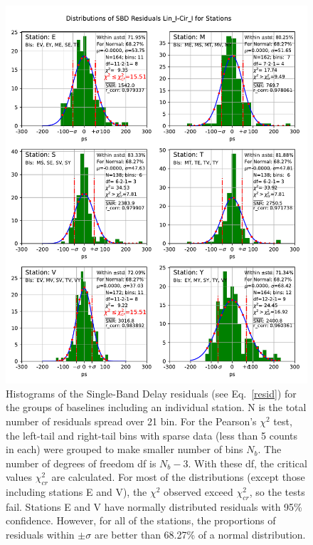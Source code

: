 \documentclass[letterpaper,twoside,12pt]{article}
\begin{document}
\begin{figure}[ht!]
  \begin{center}
  \includegraphics[width=33pc]{Distr_SBD_Lin_I-Cir_I_Diff_Stations.pdf}
  \caption{\small Histograms of the Single-Band Delay residuals (see Eq.~\eqref{resid}) for the groups of baselines including an individual station. N is the total number of residuals spread over 21 bin. For the Pearson's $\chi^2$ test, the left-tail and right-tail bins with sparse data (less than 5 counts in each) were grouped to make smaller number of bins $N_b$. The number of degrees of freedom df is $N_b-3$. With these df, the critical values $\chi^2_{cr}$ are calculated. For most of the distributions (except those including stations E and V), the $\chi^2$ observed exceed $\chi^2_{cr}$, so the tests fail. Stations E and V have normally distributed residuals with 95\% confidence. However, for all of the stations, the proportions of residuals within $\pm\sigma$ are better than 68.27\% of a normal distribution.}
  \label{dsbd_distr_st}
  \end{center}
\end{figure}
\end{document}
